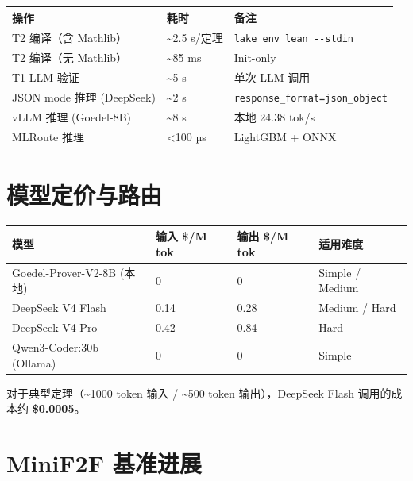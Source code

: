 \documentclass[
  11pt,
  a4paper,
]{ctexrep}
\newcounter{none} %
\begin{document}
{\def\LTcaptype{none} %
\begin{longtable}[]{@{}lll@{}}
\toprule\noalign{}
操作 & 耗时 & 备注 \\
\midrule\noalign{}
\endhead
\bottomrule\noalign{}
\endlastfoot
T2 编译（含 Mathlib） & \textasciitilde2.5 s/定理 &
\texttt{lake\ env\ lean\ -\/-stdin} \\
T2 编译（无 Mathlib） & \textasciitilde85 ms & Init-only \\
T1 LLM 验证 & \textasciitilde5 s & 单次 LLM 调用 \\
JSON mode 推理 (DeepSeek) & \textasciitilde2 s &
\texttt{response\_format=json\_object} \\
vLLM 推理 (Goedel-8B) & \textasciitilde8 s & 本地 24.38 tok/s \\
MLRoute 推理 & \textless100 µs & LightGBM + ONNX \\
\end{longtable}
}

\section{模型定价与路由}\label{sec-pricing}

{\def\LTcaptype{none} %
\begin{longtable}[]{@{}llll@{}}
\toprule\noalign{}
模型 & 输入 \$/M tok & 输出 \$/M tok & 适用难度 \\
\midrule\noalign{}
\endhead
\bottomrule\noalign{}
\endlastfoot
Goedel-Prover-V2-8B (本地) & 0 & 0 & Simple / Medium \\
DeepSeek V4 Flash & 0.14 & 0.28 & Medium / Hard \\
DeepSeek V4 Pro & 0.42 & 0.84 & Hard \\
Qwen3-Coder:30b (Ollama) & 0 & 0 & Simple \\
\end{longtable}
}

对于典型定理（\textasciitilde1000 token 输入 / \textasciitilde500 token
输出），DeepSeek Flash 调用的成本约 \textbf{\$0.0005}。

\section{MiniF2F 基准进展}\label{sec-benchmark}
\end{document}
